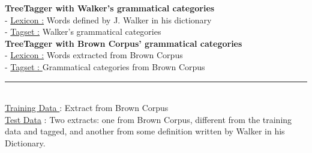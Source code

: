\begin{center}
\textbf{TreeTagger with Walker's grammatical categories}\\[3mm]

	- \underline{Lexicon :} Words defined by J. Walker in his dictionary\\[2mm]
	- \underline{Tagset :} Walker's grammatical categories\\[2mm]

\textbf{TreeTagger with Brown Corpus' grammatical categories}\\[3mm]

	- \underline{Lexicon :} Words extracted from Brown Corpus\\[2mm]
	- \underline{Tagset : } Grammatical categories from Brown Corpus\\[3mm]

\noindent\rule{4cm}{0.4pt} \\[2mm]

\underline{Training Data }: Extract from Brown Corpus\\[2mm]
\underline{Test Data} : Two extracts: one from Brown Corpus, different from the training data and tagged, and another from some definition written by Walker in his Dictionary.
\end{center}
